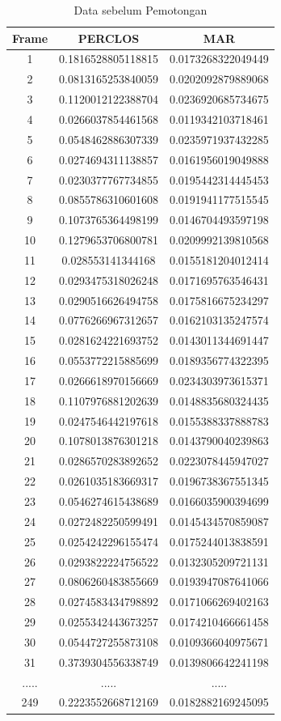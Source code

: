 \begin{longtable}{|c|c|c|}
  \caption{Data sebelum Pemotongan}
  \label{tb:sebelumpemotongan}                                   \\
  \hline
  \rowcolor[HTML]{C0C0C0}
  \textbf{Frame} & \textbf{PERCLOS} & \textbf{MAR} \\
  \hline
  1   & 0.1816528805118815 & 0.0173268322049449 \\
  2   & 0.0813165253840059 & 0.0202092879889068 \\
  3   & 0.1120012122388704 & 0.0236920685734675 \\
  4   & 0.0266037854461568 & 0.0119342103718461 \\
  5   & 0.0548462886307339 & 0.0235971937432285 \\
  6   & 0.0274694311138857 & 0.0161956019049888 \\
  7   & 0.0230377767734855 & 0.0195442314445453 \\
  8   & 0.0855786310601608 & 0.0191941177515545 \\
  9   & 0.1073765364498199 & 0.0146704493597198 \\
  10  & 0.1279653706800781 & 0.0209992139810568 \\
  11  & 0.028553141344168  & 0.0155181204012414 \\
  12  & 0.0293475318026248 & 0.0171695763546431 \\
  13  & 0.0290516626494758 & 0.0175816675234297 \\
  14  & 0.0776266967312657 & 0.0162103135247574 \\
  15  & 0.0281624221693752 & 0.0143011344691447 \\
  16  & 0.0553772215885699 & 0.0189356774322395 \\
  17  & 0.0266618970156669 & 0.0234303973615371 \\
  18  & 0.1107976881202639 & 0.0148835680324435 \\
  19  & 0.0247546442197618 & 0.0155388337888783 \\
  20  & 0.1078013876301218 & 0.0143790040239863 \\
  21  & 0.0286570283892652 & 0.0223078445947027 \\
  22  & 0.0261035183669317 & 0.0196738367551345 \\
  23  & 0.0546274615438689 & 0.0166035900394699 \\
  24  & 0.0272482250599491 & 0.0145434570859087 \\
  25  & 0.0254242296155474 & 0.0175244013838591 \\
  26  & 0.0293822224756522 & 0.0132305209721131 \\
  27  & 0.0806260483855669 & 0.0193947087641066 \\
  28  & 0.0274583434798892 & 0.0171066269402163 \\
  29  & 0.0255342443673257 & 0.0174210466661458 \\
  30  & 0.0544727255873108 & 0.0109366040975671 \\
  31  & 0.3739304556338749 & 0.0139806642241198 \\
  ..... & ..... & ..... \\
  249 & 0.2223552668712169 & 0.0182882169245095 \\


\end{longtable}
